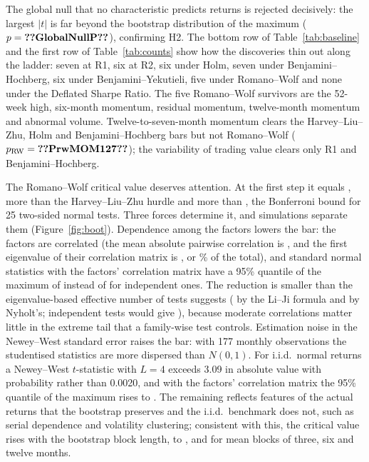 \documentclass[11pt]{article}
\newcommand{\RW}{Romano--Wolf}
\begin{document}
The global null that no characteristic predicts returns is rejected decisively: the largest $|t|$ is far beyond the
bootstrap distribution of the maximum ($p=\val{GlobalNullP}$), confirming H2. The bottom row of
Table~\ref{tab:baseline} and the first row of Table~\ref{tab:counts} show how the discoveries thin out along the
ladder: seven at R1, six at R2, six under Holm, seven under Benjamini--Hochberg, six under Benjamini--Yekutieli, five
under \RW{} and none under the Deflated Sharpe Ratio. The five \RW{} survivors are the 52-week high, six-month momentum,
residual momentum, twelve-month momentum and abnormal volume. Twelve-to-seven-month momentum clears the Harvey--Liu--Zhu,
Holm and Benjamini--Hochberg bars but not \RW{} ($p_{\text{RW}}=\val{PrwMOM127}$); the variability of trading value
clears only R1 and Benjamini--Hochberg.

The \RW{} critical value deserves attention. At the first step it equals , more than the Harvey--Liu--Zhu
hurdle and more than , the Bonferroni bound for 25 two-sided normal tests. Three forces determine it,
and simulations separate them (Figure~\ref{fig:boot}). Dependence among the factors lowers the bar: the factors are
correlated (the mean absolute pairwise correlation is , and the first eigenvalue of their correlation
matrix is , or \% of the total), and standard normal statistics with the factors' correlation
matrix have a 95\% quantile of the maximum of  instead of  for independent ones. The
reduction is smaller than the eigenvalue-based effective number of tests suggests ( by the Li--Ji formula
and  by Nyholt's;  independent tests would give ), because moderate
correlations matter little in the extreme tail that a family-wise test controls. Estimation noise in the Newey--West
standard error raises the bar: with 177 monthly observations the studentised statistics are more dispersed than
$N(0,1)$. For i.i.d.\ normal returns a Newey--West $t$-statistic with $L=4$ exceeds 3.09 in absolute value with
probability  rather than 0.0020, and with the factors' correlation matrix the 95\% quantile of the
maximum rises to . The remaining  reflects features of the actual returns that the
bootstrap preserves and the i.i.d.\ benchmark does not, such as serial dependence and volatility clustering;
consistent with this, the critical value rises with the bootstrap block length, to ,  and
 for mean blocks of three, six and twelve months.
\end{document}
